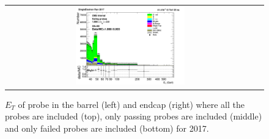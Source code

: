 \begin{figure}[htp]
\begin{center}
\begin{tabular}{cc}
      \includegraphics[width=0.45\textwidth]{figures/Zprime/2017/ScaleFactor/SameSign/nominal/stack_Et_Endcap_fail_PUW.png}
    \end{tabular}
    \caption{$E_{T}$ of probe in the barrel (left) and endcap (right) where all the probes are included (top), only passing probes are included (middle) and only failed probes are included (bottom) for 2017.}
    \label{fig:SS_nominal_Et_2017}
  \end{center}
\end{figure}
